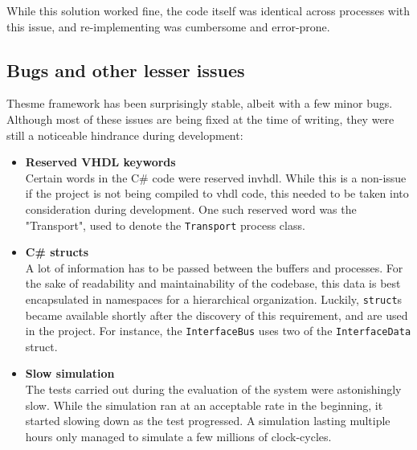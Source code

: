 While this solution worked fine, the code itself was identical across processes
with this issue, and re-implementing was cumbersome and error-prone.

\subsection{Bugs and other lesser issues}
The\gls{sme} framework has been surprisingly stable, albeit with a few minor
bugs. Although most of these issues are being fixed at the time of writing,
they were still a noticeable hindrance during development:
\begin{itemize}
\item \textbf{Reserved VHDL keywords}\\
Certain words in the C\# code were reserved in\gls{vhdl}. While this is a
non-issue if the project is not being compiled to \gls{vhdl} code, this needed
to be taken into consideration during development. One such reserved word  was
the "Transport", used to denote the \texttt{Transport} process class.

\item \textbf{C\# structs}\\
A lot of information has to be passed between the buffers and processes. For
the sake of readability and maintainability of the codebase, this data is best
encapsulated in namespaces for a hierarchical organization.
Luckily, \texttt{struct}s became available shortly after the discovery of this
requirement, and are used in the project. For instance, the
\texttt{InterfaceBus} uses two of the \texttt{InterfaceData} struct.

\item \textbf{Slow simulation}\\
The tests carried out during the evaluation of the system were astonishingly
slow. While the simulation ran at an acceptable rate in the beginning, it
started slowing down as the test progressed. A simulation lasting multiple
hours only managed to simulate a few millions of clock-cycles.

\end{itemize}


